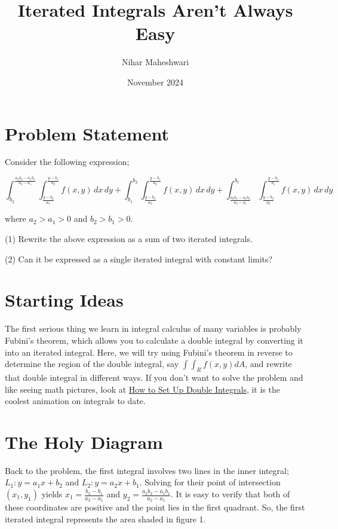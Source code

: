 \documentclass{article}
\title{Iterated Integrals Aren't Always Easy}
\author{Nihar Maheshwari}
\date{November 2024}
\begin{document}
\maketitle

\section{Problem Statement}

Consider the following expression;

$$\int_{b_2}^{\frac{a_2b_2-a_1b_1}{a_2-a_1}} \int_{\frac{y-b_2}{a_1}}^{\frac{y-b_1}{a_2}} f(x,y) \, dx \, dy + \int_{b_1}^{b_2} \int_{\frac{y-b_2}{a_2}}^{\frac{y-b_1}{a_2}} f(x,y) \, dx \, dy+\int_{\frac{a_2b_1-a_1b_2}{a_2-a_1}}^{b_1} \int_{\frac{y-b_2}{a_2}}^{\frac{y-b_1}{a_1}} f(x,y) \, dx \, dy$$

where $a_2>a_1>0$ and $b_2>b_1>0$.

(1) Rewrite the above expression as a sum of two iterated integrals.

(2) Can it be expressed as a single iterated integral with constant limits?

\section{Starting Ideas}

The first serious thing we learn in integral calculus of many variables is probably Fubini's theorem, which allows you to calculate a double integral by converting it into an iterated integral. Here, we will try using Fubini's theorem in reverse to determine the region of the double integral, say $\displaystyle \int \int_R f(x,y) dA$, and rewrite that double integral in different ways. If you don't want to solve the problem and like seeing math pictures, look at \href{https://youtu.be/jNpKKDekS6k?si=dtOFQmNTdBkPqaZY}{How to Set Up Double Integrals}, it is the coolest animation on integrals to date.

\section{The Holy Diagram}
Back to the problem, the first integral involves two lines in the inner integral; $L_1:y=a_1x+b_2$ and $L_2: y=a_2x+b_1$. Solving for their point of intersection $(x_1,y_1)$ yields $x_1=\displaystyle \frac{b_2-b_1}{a_2-a_1}$ and $y_2=\displaystyle \frac{a_2b_2-a_1b_1}{a_2-a_1}$. It is easy to verify that both of these coordinates are positive and the point lies in the first quadrant. So, the first iterated integral represents the area shaded in figure 1.
\end{document}
